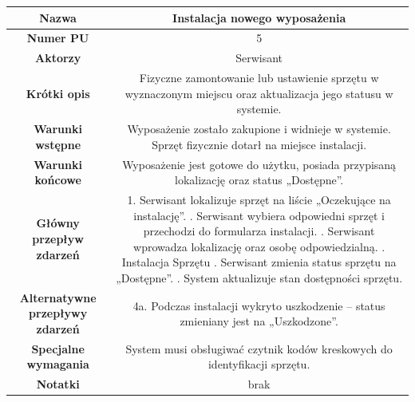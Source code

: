 \documentclass{article}
\begin{document}
    \begin{tabular}{|c|c|}%
        \hline
        \textbf{Nazwa} & Instalacja nowego wyposażenia \\
        \hline
        \textbf{Numer PU} & 5 \\
        \hline
        \textbf{Aktorzy} & Serwisant \\
        \hline
        \textbf{Krótki opis} & Fizyczne zamontowanie lub ustawienie sprzętu w wyznaczonym miejscu oraz aktualizacja jego statusu w systemie. \\
        \hline
        \textbf{Warunki wstępne} & Wyposażenie zostało zakupione i widnieje w systemie. Sprzęt fizycznie dotarł na miejsce instalacji. \\
        \hline
        \textbf{Warunki końcowe} & Wyposażenie jest gotowe do użytku, posiada przypisaną lokalizację oraz status „Dostępne”. \\
        \hline
        \textbf{Główny przepływ zdarzeń} & 
            1. Serwisant lokalizuje sprzęt na liście „Oczekujące na instalację”. \newline
            2. Serwisant wybiera odpowiedni sprzęt i przechodzi do formularza instalacji. \newline
            3. Serwisant wprowadza lokalizację oraz osobę odpowiedzialną. \newline
            4. Instalacja Sprzętu \newline
            5. Serwisant zmienia status sprzętu na „Dostępne”. \newline
            6. System aktualizuje stan dostępności sprzętu. \\
        \hline
        \textbf{Alternatywne przepływy zdarzeń} & 
            4a. Podczas instalacji wykryto uszkodzenie – status zmieniany jest na „Uszkodzone”. \\
        \hline
        \textbf{Specjalne wymagania} & System musi obsługiwać czytnik kodów kreskowych do identyfikacji sprzętu. \\
        \hline
        \textbf{Notatki} & brak \\
        \hline
    \end{tabular}

    \vspace{1cm}
\end{document}
